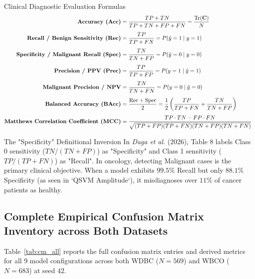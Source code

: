 \documentclass[11pt,a4paper]{article}
\begin{document}
\begin{metricbox}{Clinical Diagnostic Evaluation Formulas}
\begin{align}
\text{\textbf{Accuracy (Acc)}} &= \frac{TP + TN}{TP + TN + FP + FN} = \frac{\text{Tr}(\mathbf{C})}{N} \\[0.4em]
\text{\textbf{Recall / Benign Sensitivity (Rec)}} &= \frac{TP}{TP + FN} = P(\hat{y}=1 \mid y=1) \\[0.4em]
\text{\textbf{Specificity / Malignant Recall (Spec)}} &= \frac{TN}{TN + FP} = P(\hat{y}=0 \mid y=0) \\[0.4em]
\text{\textbf{Precision / PPV (Prec)}} &= \frac{TP}{TP + FP} = P(y=1 \mid \hat{y}=1) \\[0.4em]
\text{\textbf{Malignant Precision / NPV}} &= \frac{TN}{TN + FN} = P(y=0 \mid \hat{y}=0) \\[0.4em]
\text{\textbf{Balanced Accuracy (BAcc)}} &= \frac{\text{Rec} + \text{Spec}}{2} = \frac{1}{2}\left(\frac{TP}{TP+FN} + \frac{TN}{TN+FP}\right) \\[0.4em]
\text{\textbf{Matthews Correlation Coefficient (MCC)}} &= \frac{TP \cdot TN - FP \cdot FN}{\sqrt{(TP+FP)(TP+FN)(TN+FP)(TN+FN)}}
\end{align}
\end{metricbox}

\begin{findingbox}{The "Specificity" Definitional Inversion}
In \textit{Daga et al.} (2026), Table 8 labels Class 0 sensitivity ($TN/(TN+FP)$) as "Specificity" and Class 1 sensitivity ($TP/(TP+FN)$) as "Recall". In oncology, detecting Malignant cases is the primary clinical objective. When a model exhibits $99.5\%$ Recall but only $88.1\%$ Specificity (as seen in `QSVM Amplitude`), it misdiagnoses over $11\%$ of cancer patients as healthy.
\end{findingbox}

\subsection{Complete Empirical Confusion Matrix Inventory across Both Datasets}

Table~\ref{tab:cm_all} reports the full confusion matrix entries and derived metrics for all 9 model configurations across both WDBC ($N=569$) and WBCO ($N=683$) at seed $42$.
\end{document}
